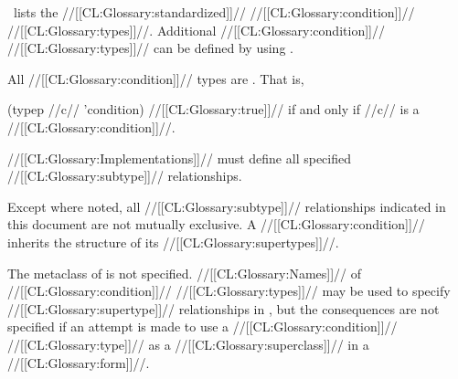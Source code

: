 
 
\Thenextfigure\ lists the //[[CL:Glossary:standardized]]// //[[CL:Glossary:condition]]// //[[CL:Glossary:types]]//.
Additional //[[CL:Glossary:condition]]// //[[CL:Glossary:types]]// can be defined by using .









All //[[CL:Glossary:condition]]// types are .  That is,
 
\code
 (typep //c// 'condition) \EV //[[CL:Glossary:true]]//
\endcode
if and only if //c// is a //[[CL:Glossary:condition]]//.
 
//[[CL:Glossary:Implementations]]// must define all specified //[[CL:Glossary:subtype]]// relationships.

Except where noted, all //[[CL:Glossary:subtype]]// relationships indicated in 
this document are not mutually exclusive.
A //[[CL:Glossary:condition]]// inherits the structure of its //[[CL:Glossary:supertypes]]//.


 
The metaclass of  is not specified.
//[[CL:Glossary:Names]]// of //[[CL:Glossary:condition]]// //[[CL:Glossary:types]]// may be used to specify
//[[CL:Glossary:supertype]]// relationships in , 
but the consequences are not specified if an attempt is made to use
a //[[CL:Glossary:condition]]// //[[CL:Glossary:type]]// as a //[[CL:Glossary:superclass]]// in a  //[[CL:Glossary:form]]//.






























